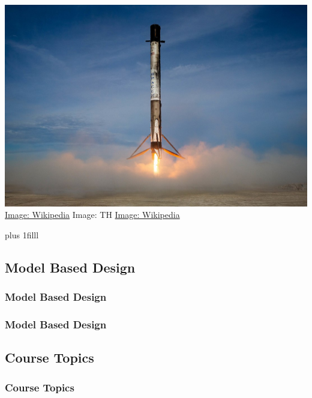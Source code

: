 \documentclass[fleqn]{beamer} %
\newcommand{\sectionIsubsectionIIItitle}{Model Based Design}
\newcommand{\sectionIsubsectionIVtitle}{Course Topics}
\newcommand{\btVFill}{\vskip0pt plus 1filll}
\begin{document}
\begin{frame}
				\includegraphics[scale=.1]{images/falcon9_fig2.jpg} \\
				{\tiny\href{https://en.wikipedia.org/wiki/Phantom_(UAV)}{Image: Wikipedia} \hspace{20mm}Image: TH \hspace{20mm}\href{https://en.wikipedia.org/wiki/SpaceX\#/media/File:CRS-18_Mission_(48380511427).jpg}{Image: Wikipedia} }

				\btVFill
			\end{frame}


		\subsection{\sectionIsubsectionIIItitle}\label{sectionIsubsectionIII}
			\begin{frame} 
				\frametitle{\sectionIsubsectionIIItitle}
		

			\end{frame}	

			\begin{frame} 
				\frametitle{\sectionIsubsectionIIItitle}
		

			\end{frame}	

		\subsection{\sectionIsubsectionIVtitle}\label{sectionIsubsectionIV}	

			\begin{frame}
				\frametitle{\sectionIsubsectionIVtitle}
		

			\end{frame}
\end{document}
